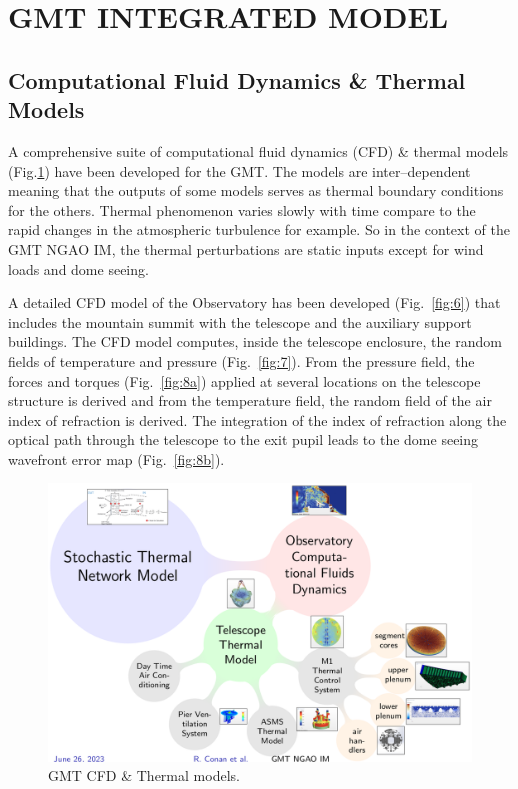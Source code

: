 \documentclass[]{AO4ELT}  %
\begin{document}
\clearpage

\section{GMT INTEGRATED MODEL}
\label{seg:gmt-im}

\subsection{Computational Fluid Dynamics \& Thermal Models}
\label{sec:cfd}

A comprehensive suite of computational fluid dynamics (CFD) \& thermal models (Fig.\ref{fig:5}) have been developed for the GMT.
The models are inter--dependent meaning that the outputs of some models serves as thermal boundary conditions for the others.
Thermal phenomenon varies slowly with time compare to the rapid changes in the atmospheric turbulence for example.
So in the context of the GMT NGAO IM, the thermal perturbations are static inputs except for wind loads and dome seeing.

A detailed CFD model of the Observatory has been developed (Fig.~\ref{fig:6}) that includes the mountain summit
with the telescope and the auxiliary support buildings.
The CFD model computes, inside the telescope enclosure, the random fields of temperature and pressure (Fig.~\ref{fig:7}).
From the pressure field, the forces and torques (Fig.~\ref{fig:8a}) applied at several locations on the telescope structure is derived and
from the temperature field, the random field of the air index of refraction is derived.
The integration of the index of refraction along the optical path through the telescope
to the exit pupil leads to the dome seeing wavefront error map (Fig.~\ref{fig:8b}).

\begin{figure}
   \centering
   \includegraphics[width=0.8\linewidth]{cfd-thermal_models.png}
   \caption{GMT CFD \& Thermal models.}
   \label{fig:5}
\end{figure}
\end{document}
